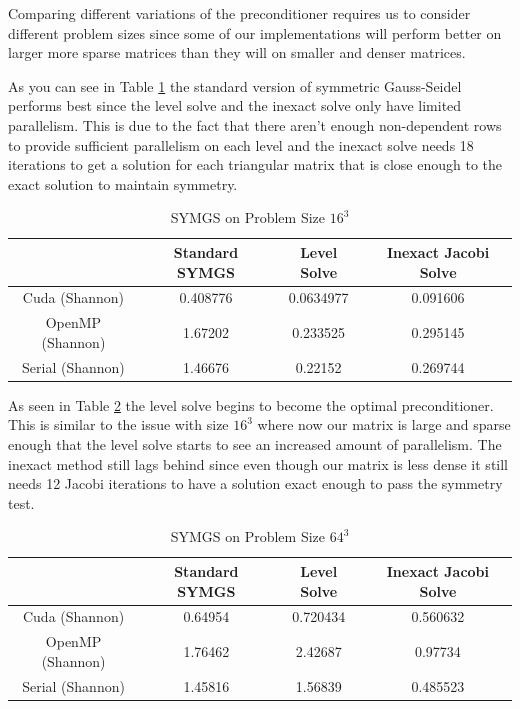 \documentclass{ccr15}
\begin{document}
Comparing different variations of the preconditioner requires us to consider different problem sizes
since some of our implementations will perform better on larger more sparse matrices than they will
on smaller and denser matrices. 

As you can see in Table \ref{SYMGS16} the standard version of symmetric Gauss-Seidel performs
best since the level solve and the inexact solve only have limited parallelism. This is due to
the fact that there aren't enough non-dependent rows to provide sufficient parallelism on each
level and the inexact solve needs 18 iterations to get a solution for each triangular matrix that
is close enough to the exact solution to maintain symmetry.

\begin{table}[h]
\begin{center}
\begin{tabular}{|c||c|c|c|}
\hline
 & Standard SYMGS & Level Solve & Inexact Jacobi Solve \\
 \hline \hline
 Cuda (Shannon) & 0.408776 & 0.0634977 & 0.091606 \\
 \hline
 OpenMP (Shannon) & 1.67202 & 0.233525 & 0.295145 \\
 \hline
 Serial (Shannon) & 1.46676 & 0.22152 & 0.269744 \\
 \hline
\end{tabular}
\caption{SYMGS on Problem Size $16^3$}
\label{SYMGS16}
\end{center}
\end{table}

As seen in Table \ref{SYMGS64} the level solve begins to become the optimal preconditioner. This
is similar to the issue with size $16^3$ where now our matrix is large and sparse enough that
the level solve starts to see an increased amount of parallelism. The inexact method still lags
behind since even though our matrix is less dense it still needs 12 Jacobi iterations to have
a solution exact enough to pass the symmetry test.

\begin{table}[h]
\begin{center}
\begin{tabular}{|c||c|c|c|}
\hline
& Standard SYMGS & Level Solve & Inexact Jacobi Solve \\
\hline \hline
Cuda (Shannon) & 0.64954 & 0.720434 & 0.560632 \\
\hline
OpenMP (Shannon) & 1.76462 & 2.42687 & 0.97734 \\
\hline
Serial (Shannon) & 1.45816 & 1.56839 & 0.485523 \\
\hline
\end{tabular}
\caption{SYMGS on Problem Size $64^3$}
\label{SYMGS64}
\end{center}
\end{table}
\end{document}
